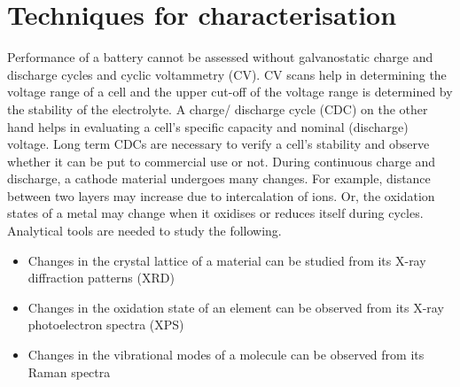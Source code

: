 \chapter{Techniques for characterisation} %

\label{chap2} %

Performance of a battery cannot be assessed without galvanostatic charge and discharge cycles and cyclic voltammetry (CV). CV scans help in determining the voltage range of a cell and the upper cut-off of the voltage range is determined by the stability of the electrolyte. A charge/ discharge cycle (CDC) on the other hand helps in evaluating a cell's specific capacity and nominal (discharge) voltage. Long term CDCs are necessary to verify a cell's stability and observe whether it can be put to commercial use or not. 
During continuous charge and discharge, a cathode material undergoes many changes. For example, distance between two layers may increase due to intercalation of ions. Or, the oxidation states of a metal may change when it oxidises or reduces itself during cycles. Analytical tools are needed to study the following. 

\begin{itemize}
    \item Changes in the crystal lattice of a material can be studied from its X-ray diffraction patterns (XRD)
    \item Changes in the oxidation state of an element can be observed from its X-ray photoelectron spectra (XPS)
    \item Changes in the vibrational modes of a molecule can be observed from its Raman spectra 
\end{itemize}

